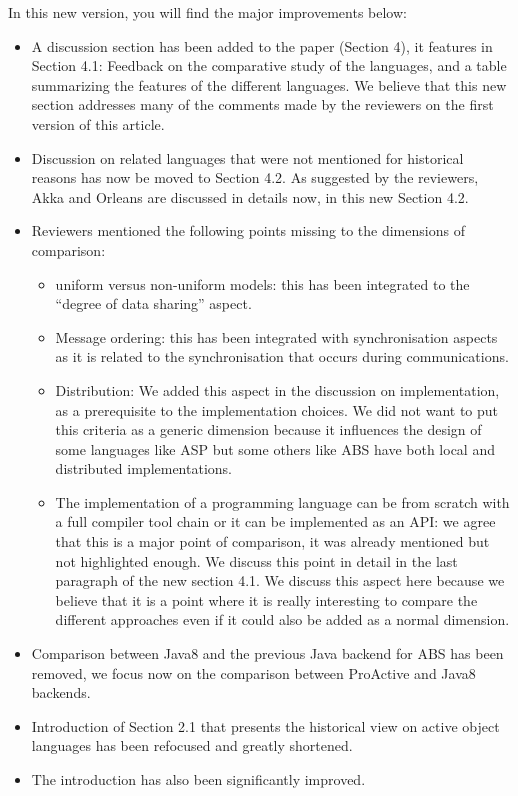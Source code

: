 \documentclass{article}
\begin{document}
In this new version, you will find the major improvements below:
\begin{itemize}
\item A discussion section has been added to the paper (Section 4), it features in 
Section 4.1: Feedback on the 
comparative study of the languages, and a table summarizing the features of the different 
languages. We believe that this new section addresses many of the comments made by the 
reviewers on the first version of this article.
\item Discussion on  related languages that were not mentioned for historical reasons has 
now be moved to Section 4.2. As suggested by the reviewers, Akka and Orleans are 
discussed in details now, in this new Section 4.2.
\item Reviewers mentioned the following points missing to the dimensions of comparison: 
\begin{itemize}
\item uniform versus non-uniform models: this has been integrated to the ``degree of data 
sharing'' aspect.
\item Message ordering: this has been integrated with synchronisation aspects as it is 
related to the synchronisation that occurs during communications.
\item Distribution: We added this aspect in the discussion on implementation, as a 
prerequisite to the implementation choices. We did not want to put this criteria as a 
generic dimension because it influences the design of some languages like ASP but some 
others like ABS have both local and distributed implementations.
\item The implementation of a programming language can be from scratch with a full 
compiler tool chain or it can be implemented as an API: we agree that this is a major 
point of comparison, it was already mentioned but not highlighted enough. We discuss this 
point in detail in the last paragraph of the new section 4.1. We discuss this aspect here 
because we believe that it is a point where it is really interesting to compare the 
different approaches even if it could also be added as a normal dimension.
\end{itemize}

\item Comparison between Java8 and the previous Java backend for ABS has been removed, we 
focus now on the comparison between ProActive and Java8 backends.
\end{itemize}
\begin{itemize}
	\item Introduction of Section 2.1 that presents the historical view on active object 
	languages has been refocused and greatly shortened.
\item The introduction has also been significantly improved.
\end{itemize}
\end{document}
